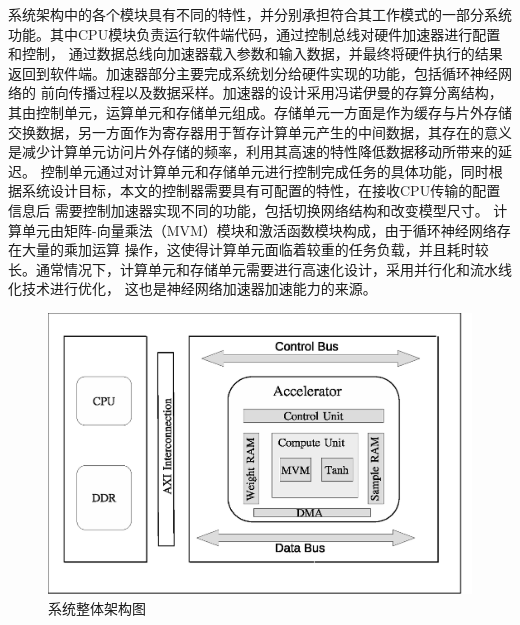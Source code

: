 系统架构中的各个模块具有不同的特性，并分别承担符合其工作模式的一部分系统功能。其中CPU模块负责运行软件端代码，通过控制总线对硬件加速器进行配置和控制，
通过数据总线向加速器载入参数和输入数据，并最终将硬件执行的结果返回到软件端。加速器部分主要完成系统划分给硬件实现的功能，包括循环神经网络的
前向传播过程以及数据采样。加速器的设计采用冯诺伊曼的存算分离结构，其由控制单元，运算单元和存储单元组成。存储单元一方面是作为缓存与片外存储
交换数据，另一方面作为寄存器用于暂存计算单元产生的中间数据，其存在的意义是减少计算单元访问片外存储的频率，利用其高速的特性降低数据移动所带来的延迟。
控制单元通过对计算单元和存储单元进行控制完成任务的具体功能，同时根据系统设计目标，本文的控制器需要具有可配置的特性，在接收CPU传输的配置信息后
需要控制加速器实现不同的功能，包括切换网络结构和改变模型尺寸。 计算单元由矩阵-向量乘法（MVM）模块和激活函数模块构成，由于循环神经网络存在大量的乘加运算
操作，这使得计算单元面临着较重的任务负载，并且耗时较长。通常情况下，计算单元和存储单元需要进行高速化设计，采用并行化和流水线化技术进行优化，
这也是神经网络加速器加速能力的来源。
\begin{figure}
	\centering
	\includegraphics[width=0.8\columnwidth]{exp/fig_systemArch2.eps}
	\caption{系统整体架构图}
	\label{fig:sysArch}
\end{figure}

